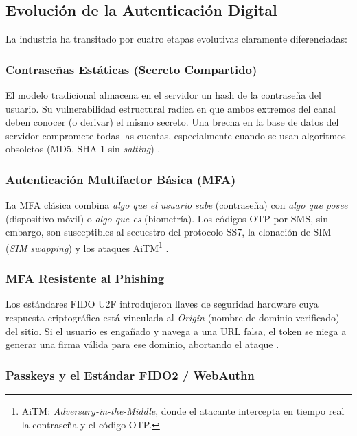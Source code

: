 \documentclass[12pt, a4paper]{article}
\begin{document}
\subsection{Evolución de la Autenticación Digital}
\label{sec:evolucion}

La industria ha transitado por cuatro etapas evolutivas claramente diferenciadas:

\subsubsection{Contraseñas Estáticas (Secreto Compartido)}

El modelo tradicional almacena en el servidor un hash de la contraseña del usuario.
Su vulnerabilidad estructural radica en que ambos extremos del canal deben
conocer (o derivar) el mismo secreto. Una brecha en la base de datos del servidor
compromete todas las cuentas, especialmente cuando se usan algoritmos obsoletos
(MD5, SHA-1 sin \textit{salting}) \cite{googleModernPass}.

\subsubsection{Autenticación Multifactor Básica (MFA)}

La MFA clásica combina \textit{algo que el usuario sabe} (contraseña) con
\textit{algo que posee} (dispositivo móvil) o \textit{algo que es} (biometría).
Los códigos OTP por SMS, sin embargo, son susceptibles al secuestro del protocolo
SS7, la clonación de SIM (\textit{SIM swapping}) y los ataques
AiTM\footnote{AiTM: \textit{Adversary-in-the-Middle}, donde el atacante
intercepta en tiempo real la contraseña y el código OTP.} \cite{srivathsav2025}.

\subsubsection{MFA Resistente al Phishing}

Los estándares FIDO U2F introdujeron llaves de seguridad hardware cuya respuesta
criptográfica está vinculada al \textit{Origin} (nombre de dominio verificado) del
sitio. Si el usuario es engañado y navega a una URL falsa, el token se niega a
generar una firma válida para ese dominio, abortando el ataque
\cite{frontegg2025,srivathsav2025}.

\subsubsection{Passkeys y el Estándar FIDO2 / WebAuthn}
\label{sec:passkeys}
\end{document}
